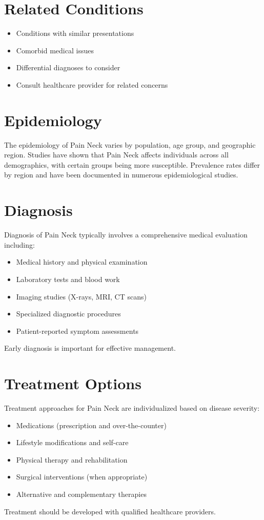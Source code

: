 \section*{Related Conditions}
\begin{itemize}
  \item Conditions with similar presentations
  \item Comorbid medical issues
  \item Differential diagnoses to consider
  \item Consult healthcare provider for related concerns
\end{itemize}

\section*{Epidemiology}
The epidemiology of Pain Neck varies by population, age group, and geographic region. Studies have shown that Pain Neck affects individuals across all demographics, with certain groups being more susceptible. Prevalence rates differ by region and have been documented in numerous epidemiological studies.

\section*{Diagnosis}
Diagnosis of Pain Neck typically involves a comprehensive medical evaluation including:
\begin{itemize}
  \item Medical history and physical examination
  \item Laboratory tests and blood work
  \item Imaging studies (X-rays, MRI, CT scans)
  \item Specialized diagnostic procedures
  \item Patient-reported symptom assessments
\end{itemize}
Early diagnosis is important for effective management.

\section*{Treatment Options}
Treatment approaches for Pain Neck are individualized based on disease severity:
\begin{itemize}
  \item Medications (prescription and over-the-counter)
  \item Lifestyle modifications and self-care
  \item Physical therapy and rehabilitation
  \item Surgical interventions (when appropriate)
  \item Alternative and complementary therapies
\end{itemize}
Treatment should be developed with qualified healthcare providers.

